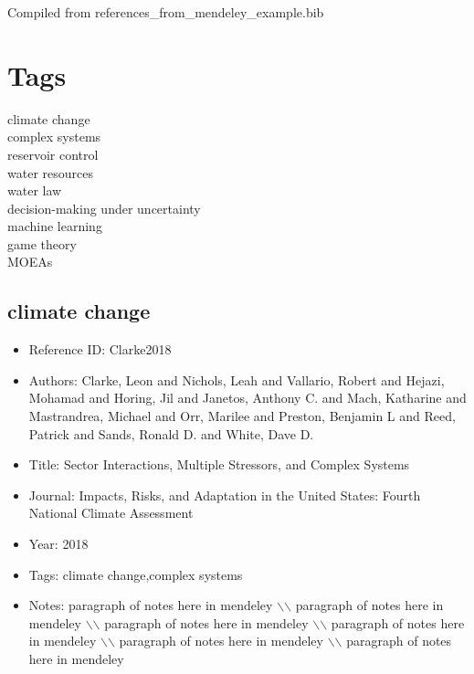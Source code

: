 \documentclass[11pt]{article}
\begin{document}
 
\maketitle 

\noindent Compiled from references\_from\_mendeley\_example.bib 

\section{Tags} 
\noindent climate change\\
\noindent complex systems\\
\noindent reservoir control\\
\noindent water resources\\
\noindent water law\\
\noindent decision-making under uncertainty\\
\noindent machine learning\\
\noindent game theory\\
\noindent MOEAs\\
\medskip



\subsection{climate change} 
\noindent\citep{Clarke2018} 
\begin{itemize} 
\item{Reference ID:  Clarke2018} 

\item{Authors:  Clarke, Leon and Nichols, Leah and Vallario, Robert and Hejazi, Mohamad and Horing, Jil and Janetos, Anthony C. and Mach, Katharine and Mastrandrea, Michael and Orr, Marilee and Preston, Benjamin L and Reed, Patrick and Sands, Ronald D. and White, Dave D.} 

\item{Title:  Sector Interactions, Multiple Stressors, and Complex Systems} 

\item{Journal:  Impacts, Risks, and Adaptation in the United States: Fourth National Climate Assessment} 

\item{Year:  2018} 

\item{Tags:  climate change,complex systems} 

\item{Notes:  paragraph of notes here in mendeley $\backslash$$\backslash$ paragraph of notes here in mendeley $\backslash$$\backslash$ paragraph of notes here in mendeley $\backslash$$\backslash$ paragraph of notes here in mendeley $\backslash$$\backslash$ paragraph of notes here in mendeley $\backslash$$\backslash$ paragraph of notes here in mendeley} 

\end{itemize}\medskip
\end{document}
